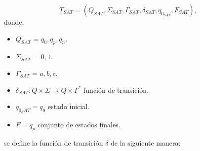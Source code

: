 \documentclass{article}
\begin{document}
\[
    T_{SAT} = (Q_{SAT}, {\Sigma}_{SAT}, \Gamma_{SAT}, \delta_{SAT}, q_{0_{SAT}}, F_{SAT}),
\]
donde:
\begin{itemize}
    \item \(Q_{SAT}\) = ${q_0,q_p,q_n}$.
    \item \(\Sigma_{SAT}\) = ${0,1}$.
    \item \(\Gamma_{SAT}\) = ${a,b,c}$.
    \item \(\delta_{SAT}: Q \times \Sigma \to Q \times \Gamma^*\) función de transición.
    \item \(q_{0_SAT} = q_0\) estado inicial.
    \item \(F={q_p}\) conjunto de estados finales.
\end{itemize}
se define la función de transición $\delta$ de la siguiente manera:
\end{document}
